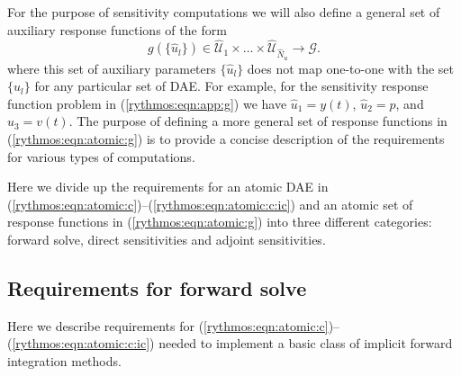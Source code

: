 \documentclass[pdf,ps2pdf,11pt]{SANDreport}
\begin{document}
For the purpose of sensitivity computations we will also define a general
set of auxiliary response functions of the form
%
\begin{equation}
g(\{\hat{u}_l\}) \in \hat{\mathcal{U}}_1 \times \ldots \times \hat{\mathcal{U}}_{\hat{N}_u} \rightarrow \mathcal{G}.
\label{rythmos:eqn:atomic:g}
\end{equation}
%
where this set of auxiliary parameters $\{\hat{u}_l\}$ does not map one-to-one
with the set $\{u_l\}$ for any particular set of DAE.  For example, for the
sensitivity response function problem in (\ref{rythmos:eqn:app:g}) we have
$\hat{u}_1 = y(t)$, $\hat{u}_2 = p$, and $\hat{u}_3 = v(t)$.  The purpose of
defining a more general set of response functions in
(\ref{rythmos:eqn:atomic:g}) is to provide a concise description of the
requirements for various types of computations.

Here we divide up the requirements for an atomic DAE in
(\ref{rythmos:eqn:atomic:c})--(\ref{rythmos:eqn:atomic:c:ic}) and an atomic
set of response functions in (\ref{rythmos:eqn:atomic:g}) into three different
categories: forward solve, direct sensitivities and adjoint sensitivities.

\subsection{Requirements for forward solve}

Here we describe requirements for
(\ref{rythmos:eqn:atomic:c})--(\ref{rythmos:eqn:atomic:c:ic}) needed to
implement a basic class of implicit forward integration methods.
\end{document}
